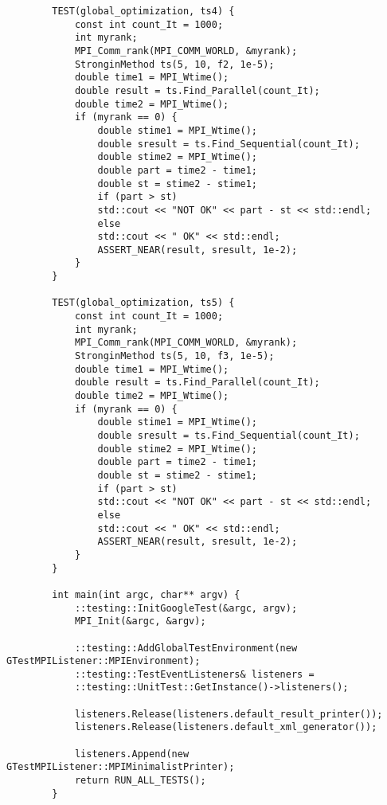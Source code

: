 \documentclass{report}
\begin{document}
\begin{lstlisting}
		TEST(global_optimization, ts4) {
			const int count_It = 1000;
			int myrank;
			MPI_Comm_rank(MPI_COMM_WORLD, &myrank);
			StronginMethod ts(5, 10, f2, 1e-5);
			double time1 = MPI_Wtime();
			double result = ts.Find_Parallel(count_It);
			double time2 = MPI_Wtime();
			if (myrank == 0) {
				double stime1 = MPI_Wtime();
				double sresult = ts.Find_Sequential(count_It);
				double stime2 = MPI_Wtime();
				double part = time2 - time1;
				double st = stime2 - stime1;
				if (part > st)
				std::cout << "NOT OK" << part - st << std::endl;
				else
				std::cout << " OK" << std::endl;
				ASSERT_NEAR(result, sresult, 1e-2);
			}
		}
		
		TEST(global_optimization, ts5) {
			const int count_It = 1000;
			int myrank;
			MPI_Comm_rank(MPI_COMM_WORLD, &myrank);
			StronginMethod ts(5, 10, f3, 1e-5);
			double time1 = MPI_Wtime();
			double result = ts.Find_Parallel(count_It);
			double time2 = MPI_Wtime();
			if (myrank == 0) {
				double stime1 = MPI_Wtime();
				double sresult = ts.Find_Sequential(count_It);
				double stime2 = MPI_Wtime();
				double part = time2 - time1;
				double st = stime2 - stime1;
				if (part > st)
				std::cout << "NOT OK" << part - st << std::endl;
				else
				std::cout << " OK" << std::endl;
				ASSERT_NEAR(result, sresult, 1e-2);
			}
		}
		
		int main(int argc, char** argv) {
			::testing::InitGoogleTest(&argc, argv);
			MPI_Init(&argc, &argv);
			
			::testing::AddGlobalTestEnvironment(new GTestMPIListener::MPIEnvironment);
			::testing::TestEventListeners& listeners =
			::testing::UnitTest::GetInstance()->listeners();
			
			listeners.Release(listeners.default_result_printer());
			listeners.Release(listeners.default_xml_generator());
			
			listeners.Append(new GTestMPIListener::MPIMinimalistPrinter);
			return RUN_ALL_TESTS();
		}
		
	\end{lstlisting}
	
\end{document}
